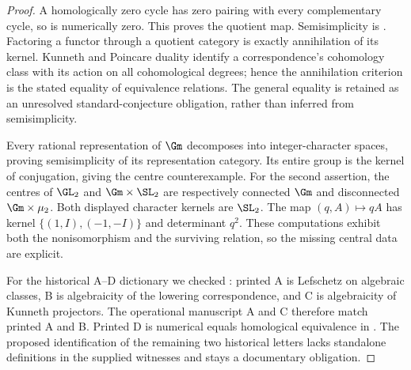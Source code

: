 \begin{proof}
A homologically zero cycle has zero pairing with every complementary cycle, so is numerically zero. This proves the quotient map. Semisimplicity is \cite[Theorem 1, p.448]{AuditJannsen1992}. Factoring a functor through a quotient category is exactly annihilation of its kernel. Kunneth and Poincare duality identify a correspondence's cohomology class with its action on all cohomological degrees; hence the annihilation criterion is the stated equality of equivalence relations. The general equality is retained as an unresolved standard-conjecture obligation, rather than inferred from semisimplicity.

Every rational representation of $\Gm$ decomposes into integer-character spaces, proving semisimplicity of its representation category. Its entire group is the kernel of conjugation, giving the centre counterexample. For the second assertion, the centres of $\GL_2$ and $\Gm\times\SL_2$ are respectively connected $\Gm$ and disconnected $\Gm\times\mu_2$. Both displayed character kernels are $\SL_2$. The map $(q,A)\mapsto qA$ has kernel $\{(1,I),(-1,-I)\}$ and determinant $q^2$. These computations exhibit both the nonisomorphism and the surviving relation, so the missing central data are explicit.

For the historical A--D dictionary we checked \cite[pp.195--197]{AuditGrothendieck1969}: printed A is Lefschetz on algebraic classes, B is algebraicity of the lowering correspondence, and C is algebraicity of Kunneth projectors. The operational manuscript A and C therefore match printed A and B. Printed D is numerical equals homological equivalence in \cite[p.17, Proposition 5-1]{AuditKleiman1994}. The proposed identification of the remaining two historical letters lacks standalone definitions in the supplied witnesses and stays a documentary obligation.


\end{proof}
